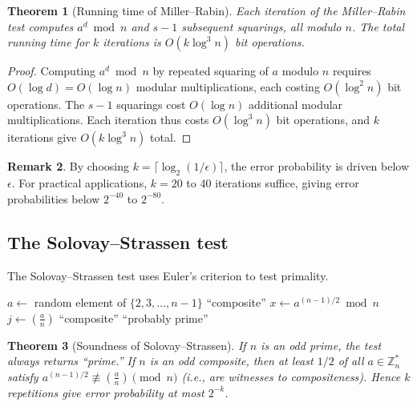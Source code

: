 \documentclass[twoside,12pt]{book}
\theoremstyle{plain}
\newtheorem{theorem}{Theorem}[chapter]
\theoremstyle{definition}
\newtheorem{remark}[theorem]{Remark}
\theoremstyle{remark}
\begin{document}
\begin{theorem}[Running time of Miller--Rabin]
\label{thm:mr-time}
Each iteration of the Miller--Rabin test computes $a^d \bmod n$ and $s-1$ subsequent squarings, all modulo $n$. The total running time for $k$ iterations is $O(k \log^3 n)$ bit operations.
\end{theorem}

\begin{proof}
Computing $a^d \bmod n$ by repeated squaring of $a$ modulo $n$ requires $O(\log d) = O(\log n)$ modular multiplications, each costing $O(\log^2 n)$ bit operations. The $s - 1$ squarings cost $O(\log n)$ additional modular multiplications. Each iteration thus costs $O(\log^3 n)$ bit operations, and $k$ iterations give $O(k \log^3 n)$ total.
\end{proof}

\begin{remark}
By choosing $k = \lceil \log_2(1/\epsilon) \rceil$, the error probability is driven below $\epsilon$. For practical applications, $k = 20$ to $40$ iterations suffice, giving error probabilities below $2^{-40}$ to $2^{-80}$.
\end{remark}

\subsection{The Solovay--Strassen test}

The Solovay--Strassen test uses Euler's criterion to test primality.

\begin{algorithm}
\caption{Solovay--Strassen Primality Test}
\label{alg:solovay-strassen}
\begin{algorithmic}[1]
 
        \State $a \gets$ random element of $\{2, 3, \ldots, n-1\}$
            \State \Return ``composite''
        \EndIf
        \State $x \gets a^{(n-1)/2} \bmod n$
        \State $j \gets \left(\frac{a}{n}\right)$ 
            \State \Return ``composite''
        \EndIf
    \EndFor
    \State \Return ``probably prime''
\EndFunction
\end{algorithmic}
\end{algorithm}

\begin{theorem}[Soundness of Solovay--Strassen]
\label{thm:solovay-strassen}
If $n$ is an odd prime, the test always returns ``prime.'' If $n$ is an odd composite, then at least $1/2$ of all $a \in \mathbb{Z}_n^*$ satisfy $a^{(n-1)/2} \not\equiv \left(\frac{a}{n}\right) \pmod{n}$ (i.e., are witnesses to compositeness). Hence $k$ repetitions give error probability at most $2^{-k}$.
\end{theorem}
\end{document}
